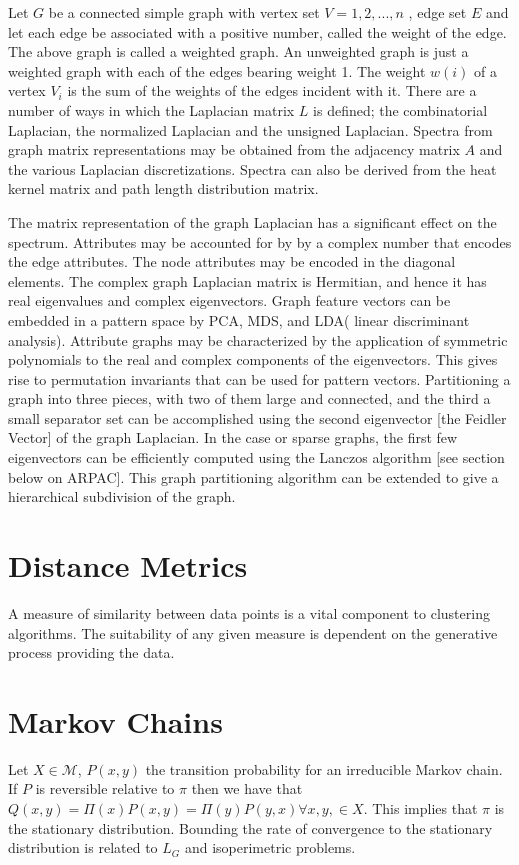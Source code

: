 Let $G$ be a connected simple graph with vertex set $V = {1, 2, ... , n}$ , edge set $E$ and let each edge be associated with a positive number, called the weight of the edge. The above graph is called a weighted graph. An unweighted graph is just a weighted graph with each of the edges bearing weight 1.  The weight $w(i)$ of a vertex $V_i$ is the sum of the weights of the edges incident with it. There are a number of ways in which the  Laplacian matrix $L$ is defined; the combinatorial Laplacian, the normalized Laplacian and the unsigned Laplacian.  Spectra from graph matrix representations may be obtained from the adjacency matrix $A$ and the various Laplacian discretizations.  Spectra can also be derived from the heat kernel matrix and path length distribution matrix.

The matrix representation of the graph Laplacian has a significant effect on the spectrum.  Attributes may be accounted for by by a complex number that encodes the edge attributes.  The node attributes may be encoded in the diagonal elements.   The complex graph Laplacian matrix is Hermitian, and hence it has real eigenvalues and complex eigenvectors.  Graph feature vectors can be embedded in a pattern space by PCA, MDS, and LDA( linear discriminant analysis).  Attribute graphs may be characterized by the application of symmetric polynomials to the real and complex components of the eigenvectors. \cite{GLPAnaFred} This gives rise to permutation invariants that can be used for pattern vectors.  Partitioning a graph into three pieces, with two of them large and connected, and the third a small separator set can be accomplished using the second eigenvector [the Feidler Vector] of the graph Laplacian.  In the case or sparse graphs, the first few eigenvectors can be efficiently computed using the Lanczos algorithm [see section below on ARPAC].  This graph partitioning algorithm can be extended to give a hierarchical subdivision of the graph.


\section*{Distance Metrics}
A measure of similarity between data points is a vital component to clustering algorithms.  The suitability of any given measure is dependent on the generative process providing the data.


\section*{Markov Chains}
Let $X \in \mathcal{M}$, $P(x,y)$ the transition probability for an irreducible Markov chain. If $P$ is reversible relative to $\pi$ then we have that $Q(x,y) = \Pi(x) P(x,y) =\Pi(y) P(y,x) \forall x,y, \in X$.  This implies that $\pi$ is the stationary distribution.  Bounding the rate of convergence to the stationary distribution is related to $L_G$ and isoperimetric problems.

